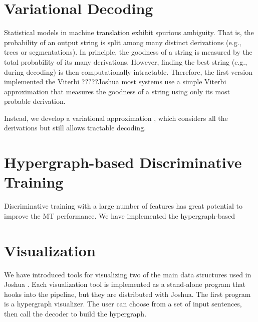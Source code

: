 \documentclass[11pt]{article}
\begin{document}

\section{Variational Decoding}
Statistical models in machine translation exhibit spurious ambiguity.
That is, the probability of an output string is split
among many distinct derivations (e.g., trees or
segmentations). In principle, the goodness of a
string is measured by the total probability of its
many derivations. However, finding the best string
(e.g., during decoding) is then computationally intractable.
Therefore, the first version implemented the Viterbi ?????Joshua most systems use a simple
Viterbi approximation that measures the goodness 
of a string using only its most probable derivation.

Instead, we develop a variational approximation \cite{variational-decoding-acl09},
which considers all the derivations but still
allows tractable decoding. 



\section{Hypergraph-based Discriminative Training}
Discriminative training with a large number of features has 
great potential to improve the MT performance.
We have implemented the hypergraph-based 


\cite{oracle-extraction-naacl09}

\section{Visualization}

We have introduced tools for visualizing two of the main data structures used
in Joshua \cite{PBML-2010-Josua-visualization}. Each visualization tool is implemented as a
stand-alone program that hooks into the pipeline, but they are distributed with
Joshua. The first program is a hypergraph visualizer. The user can choose from
a set of input sentences, then call the decoder to build the hypergraph.
\end{document}
